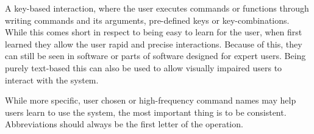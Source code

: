 \begin{definition} \label{def:command-line_interface} 
  A key-based interaction, where the user executes commands or functions through writing commands and its arguments, pre-defined keys or key-combinations. While this comes short in respect to being easy to learn for the user, when first learned they allow the user rapid and precise interactions. Because of this, they can still be seen in software or parts of software designed for expert users. Being purely text-based this can also be used to allow visually impaired users to interact with the system.

  While more specific, user chosen or high-frequency command names may help users learn to use the system, the most important thing is to be consistent. Abbreviations should always be the first letter of the operation.
  \cite[p. 159-160]{rogers}
\end{definition}